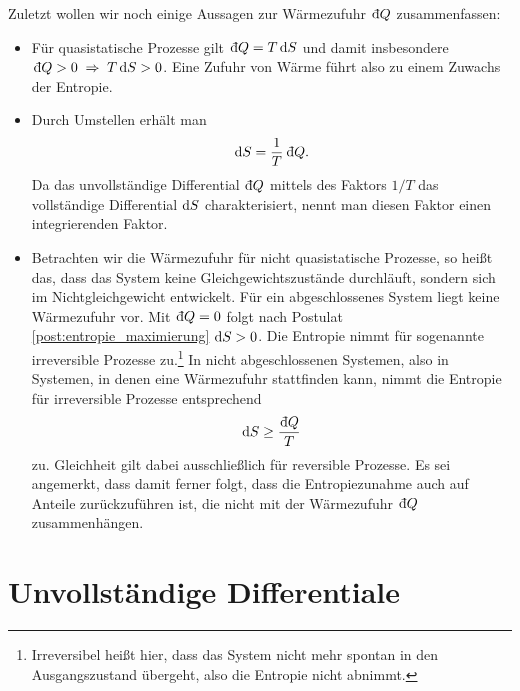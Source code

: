 Zuletzt wollen wir noch einige Aussagen zur Wärmezufuhr $\udiff Q$ zusammenfassen:
\begin{itemize}
    \item Für quasistatische Prozesse gilt $\udiff Q=T\diff S$ und damit insbesondere $\udiff Q>0\implication T\diff S>0$. Eine Zufuhr von Wärme führt also zu einem Zuwachs der Entropie.
    \item Durch Umstellen erhält man
          \begin{align*}
              \diff S = \frac{1}{T}\udiff Q.
          \end{align*}
          Da das unvollständige Differential $\udiff Q$ mittels des Faktors $1/T$ das vollständige Differential $\mathop{}\!\mathrm{d} S$ charakterisiert, nennt man diesen Faktor einen integrierenden Faktor.
    \item Betrachten wir die Wärmezufuhr für nicht quasistatische Prozesse, so heißt das, dass das System keine Gleichgewichtszustände durchläuft, sondern sich im Nichtgleichgewicht entwickelt. Für ein abgeschlossenes System liegt keine Wärmezufuhr vor. Mit $\udiff Q=0$ folgt nach Postulat \ref{post:entropie_maximierung} $\mathop{}\!\mathrm{d} S >0$. Die Entropie nimmt für sogenannte irreversible Prozesse zu.\footnote{Irreversibel heißt hier, dass das System nicht mehr spontan in den Ausgangszustand übergeht, also die Entropie nicht abnimmt.} In nicht abgeschlossenen Systemen, also in Systemen, in denen eine Wärmezufuhr stattfinden kann, nimmt die Entropie für irreversible Prozesse entsprechend
          \begin{align*}
              \diff S\geq \frac{\udiff Q}{T}
          \end{align*}
          zu.
          Gleichheit gilt dabei ausschließlich für reversible Prozesse. Es sei angemerkt, dass damit ferner folgt, dass die Entropiezunahme auch auf Anteile zurückzuführen ist, die nicht mit der Wärmezufuhr $\udiff Q$ zusammenhängen.
\end{itemize}

\section{Unvollständige Differentiale}

